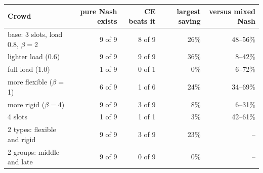 \begin{tabular}{@{}lrrrr@{}}\toprule
Crowd & pure Nash exists & CE beats it & largest saving & versus mixed Nash\\\midrule
base: 3 slots, load 0.8, $\beta=$2 & 9 of 9 & 8 of 9 & 26\% & 48--56\%\\
lighter load (0.6) & 9 of 9 & 9 of 9 & 36\% & 8--42\%\\
full load (1.0) & 1 of 9 & 0 of 1 & 0\% & 6--72\%\\
more flexible ($\beta=$1) & 6 of 9 & 1 of 6 & 24\% & 34--69\%\\
more rigid ($\beta=$4) & 9 of 9 & 3 of 9 & 8\% & 6--31\%\\
4 slots & 1 of 9 & 1 of 1 & 3\% & 42--61\%\\
2 types: flexible and rigid & 9 of 9 & 3 of 9 & 23\% & --\\
2 groups: middle and late & 9 of 9 & 0 of 9 & 0\% & --\\
\bottomrule
\end{tabular}
